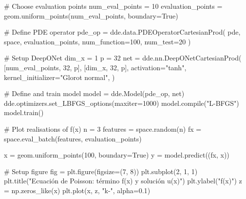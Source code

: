 \documentclass[
  spanish,
  us-letterpaper,
  DIV=11,
  numbers=noendperiod]{scrreprt}
\newenvironment{Shaded}{\begin{snugshade}}{\end{snugshade}}
\newcommand{\BuiltInTok}[1]{\textcolor[rgb]{0.00,0.23,0.31}{#1}}
\newcommand{\CommentTok}[1]{\textcolor[rgb]{0.37,0.37,0.37}{#1}}
\newcommand{\DecValTok}[1]{\textcolor[rgb]{0.68,0.00,0.00}{#1}}
\newcommand{\FloatTok}[1]{\textcolor[rgb]{0.68,0.00,0.00}{#1}}
\newcommand{\NormalTok}[1]{\textcolor[rgb]{0.00,0.23,0.31}{#1}}
\newcommand{\OperatorTok}[1]{\textcolor[rgb]{0.37,0.37,0.37}{#1}}
\newcommand{\StringTok}[1]{\textcolor[rgb]{0.13,0.47,0.30}{#1}}
\newcommand{\VariableTok}[1]{\textcolor[rgb]{0.07,0.07,0.07}{#1}}
\theoremstyle{plain}
\theoremstyle{definition}
\theoremstyle{remark}
\begin{document}
\begin{Shaded}
\begin{Highlighting}[]
\CommentTok{\# Choose evaluation points}
\NormalTok{num\_eval\_points }\OperatorTok{=} \DecValTok{10}
\NormalTok{evaluation\_points }\OperatorTok{=}\NormalTok{ geom.uniform\_points(num\_eval\_points, boundary}\OperatorTok{=}\VariableTok{True}\NormalTok{)}

\CommentTok{\# Define PDE operator}
\NormalTok{pde\_op }\OperatorTok{=}\NormalTok{ dde.data.PDEOperatorCartesianProd(}
\NormalTok{    pde,}
\NormalTok{    space,}
\NormalTok{    evaluation\_points,}
\NormalTok{    num\_function}\OperatorTok{=}\DecValTok{100}\NormalTok{,}
\NormalTok{    num\_test}\OperatorTok{=}\DecValTok{20}
\NormalTok{)}

\CommentTok{\# Setup DeepONet}
\NormalTok{dim\_x }\OperatorTok{=} \DecValTok{1}
\NormalTok{p }\OperatorTok{=} \DecValTok{32}
\NormalTok{net }\OperatorTok{=}\NormalTok{ dde.nn.DeepONetCartesianProd(}
\NormalTok{    [num\_eval\_points, }\DecValTok{32}\NormalTok{, p],}
\NormalTok{    [dim\_x, }\DecValTok{32}\NormalTok{, p],}
\NormalTok{    activation}\OperatorTok{=}\StringTok{"tanh"}\NormalTok{,}
\NormalTok{    kernel\_initializer}\OperatorTok{=}\StringTok{"Glorot normal"}\NormalTok{,}
\NormalTok{)}

\CommentTok{\# Define and train model}
\NormalTok{model }\OperatorTok{=}\NormalTok{ dde.Model(pde\_op, net)}
\NormalTok{dde.optimizers.set\_LBFGS\_options(maxiter}\OperatorTok{=}\DecValTok{1000}\NormalTok{)}
\NormalTok{model.}\BuiltInTok{compile}\NormalTok{(}\StringTok{"L{-}BFGS"}\NormalTok{)}
\NormalTok{model.train()}

\CommentTok{\# Plot realisations of f(x)}
\NormalTok{n }\OperatorTok{=} \DecValTok{3}
\NormalTok{features }\OperatorTok{=}\NormalTok{ space.random(n)}
\NormalTok{fx }\OperatorTok{=}\NormalTok{ space.eval\_batch(features, evaluation\_points)}

\NormalTok{x }\OperatorTok{=}\NormalTok{ geom.uniform\_points(}\DecValTok{100}\NormalTok{, boundary}\OperatorTok{=}\VariableTok{True}\NormalTok{)}
\NormalTok{y }\OperatorTok{=}\NormalTok{ model.predict((fx, x))}

\CommentTok{\# Setup figure}
\NormalTok{fig }\OperatorTok{=}\NormalTok{ plt.figure(figsize}\OperatorTok{=}\NormalTok{(}\DecValTok{7}\NormalTok{, }\DecValTok{8}\NormalTok{))}
\NormalTok{plt.subplot(}\DecValTok{2}\NormalTok{, }\DecValTok{1}\NormalTok{, }\DecValTok{1}\NormalTok{)}
\NormalTok{plt.title(}\StringTok{"Ecuación de Poisson: término f(x) y solución u(x)"}\NormalTok{)}
\NormalTok{plt.ylabel(}\StringTok{"f(x)"}\NormalTok{)}
\NormalTok{z }\OperatorTok{=}\NormalTok{ np.zeros\_like(x)}
\NormalTok{plt.plot(x, z, }\StringTok{"k{-}"}\NormalTok{, alpha}\OperatorTok{=}\FloatTok{0.1}\NormalTok{)}


\end{Highlighting}
\end{Shaded}
\end{document}
